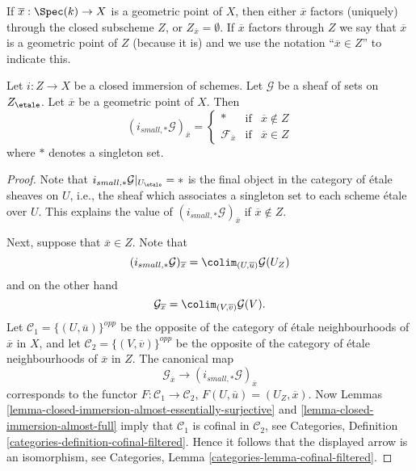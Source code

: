 \noindent
If $\overline{x} : \Spec(k) \to X$ is a geometric point of $X$, then
either $\overline{x}$ factors (uniquely) through the closed subscheme $Z$, or
$Z_{\overline{x}} = \emptyset$. If $\overline{x}$ factors through $Z$
we say that $\overline{x}$ is a geometric point of $Z$ (because it is) and
we use the notation ``$\overline{x} \in Z$'' to indicate this.

\begin{lemma}
\label{lemma-stalk-pushforward-closed-immersion}
Let $i : Z \to X$ be a closed immersion of schemes.
Let $\mathcal{G}$ be a sheaf of sets on $Z_\etale$.
Let $\overline{x}$ be a geometric point of $X$.
Then
$$
(i_{small, *}\mathcal{G})_{\overline{x}} =
\left\{
\begin{matrix}
* & \text{if} & \overline{x} \not \in Z \\
\mathcal{F}_{\overline{x}} & \text{if} & \overline{x} \in Z
\end{matrix}
\right.
$$
where $*$ denotes a singleton set.
\end{lemma}

\begin{proof}
Note that $i_{small, *}\mathcal{G}|_{U_\etale} = *$ is the final
object in the category of \'etale sheaves on $U$, i.e., the sheaf
which associates a singleton set to each scheme \'etale over $U$.
This explains the value of $(i_{small, *}\mathcal{G})_{\overline{x}}$
if $\overline{x} \not \in Z$.

\medskip\noindent
Next, suppose that $\overline{x} \in Z$. Note that
$$
(i_{small, *}\mathcal{G})_{\overline{x}}
=
\colim_{(U, \overline{u})} \mathcal{G}(U_Z)
$$
and on the other hand
$$
\mathcal{G}_{\overline{x}}
=
\colim_{(V, \overline{v})} \mathcal{G}(V).
$$
Let $\mathcal{C}_1 = \{(U, \overline{u})\}^{opp}$ be the opposite of the
category of \'etale neighbourhoods of $\overline{x}$ in $X$, and let
$\mathcal{C}_2 = \{(V, \overline{v})\}^{opp}$ be the opposite of the
category of \'etale neighbourhoods of $\overline{x}$ in $Z$. The canonical map
$$
\mathcal{G}_{\overline{x}}
\longrightarrow
(i_{small, *}\mathcal{G})_{\overline{x}}
$$
corresponds to the functor $F : \mathcal{C}_1 \to \mathcal{C}_2$,
$F(U, \overline{u}) = (U_Z, \overline{x})$. Now
Lemmas \ref{lemma-closed-immersion-almost-essentially-surjective} and
\ref{lemma-closed-immersion-almost-full}
imply that $\mathcal{C}_1$ is cofinal in $\mathcal{C}_2$, see
Categories, Definition \ref{categories-definition-cofinal-filtered}.
Hence it follows that the displayed arrow is an isomorphism, see
Categories, Lemma \ref{categories-lemma-cofinal-filtered}.
\end{proof}

